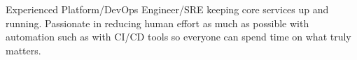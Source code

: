 

\begin{cvparagraph}

Experienced Platform/DevOps Engineer/SRE keeping core services up and running. Passionate in reducing human effort as much as possible with automation such as with CI/CD tools so everyone can spend time on what truly matters.
\end{cvparagraph}
